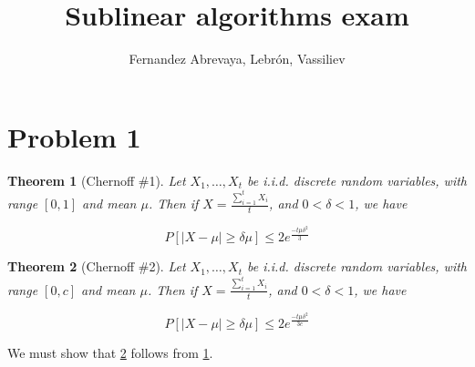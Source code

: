 \documentclass[11pt]{amsart}
\title{Sublinear algorithms exam}
\author{Fernandez Abrevaya, Lebrón, Vassiliev}
\newtheorem{theorem}{Theorem}[section]
\begin{document}
\maketitle

\section*{Problem 1}
\addtocounter{section}{1}
\setcounter{theorem}{0}


\begin{theorem}[Chernoff \#1]\label{cher1}
Let $X_1, \dots, X_t$ be i.i.d. discrete random variables, with range $[0, 1]$ and mean $\mu$. Then if $X = \frac{\sum_{i=1}^t X_i}{t}$, and $0 < \delta < 1$, we have

$$
P[|X - \mu| \ge \delta \mu] \le 2 e^{\frac{-t \mu \delta^2}{3}}
$$
\end{theorem}

\begin{theorem}[Chernoff \#2]\label{cher2}
Let $X_1, \dots, X_t$ be i.i.d. discrete random variables, with range $[0, c]$ and mean $\mu$. Then if $X = \frac{\sum_{i=1}^t X_i}{t}$, and $0 < \delta < 1$, we have

$$
P[|X - \mu| \ge \delta \mu] \le 2 e^{\frac{-t \mu \delta^2}{3c}}
$$
\end{theorem}

We must show that \ref{cher2} follows from \ref{cher1}.
\end{document}
